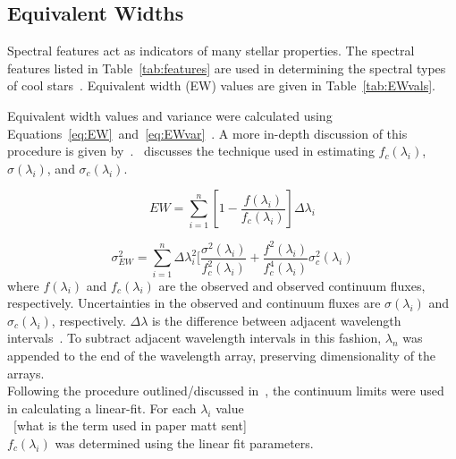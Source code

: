 \subsection{Equivalent Widths}

Spectral features act as indicators of many stellar properties.  The 
spectral features listed in Table~\ref{tab:features} 
are used in determining the spectral types of cool 
stars~\cite{Rayner_2009}.  Equivalent width (EW) 
values are given in Table~\ref{tab:EWvals}.  

 



Equivalent width values and variance were calculated using Equations~\ref{eq:EW}~and~\ref{eq:EWvar}~\cite{Cushing_2005}. %
A more in-depth discussion of this procedure is given by~\cite{Cushing_2005}.  \cite{Sembach_1992}~discusses the technique used in estimating $f_{c}(\lambda_{i})$, $\sigma(\lambda_{i})$, and $\sigma_{c}(\lambda_{i})$.



\begin{equation}\label{eq:EW}
	EW = \sum_{i=1}^{n} [1 - \frac{f(\lambda_{i})}{f_{c}(\lambda_{i})}] \Delta\lambda_{i}
\end{equation}

\begin{equation}\label{eq:EWvar}
	\sigma_{EW}^{2} = \sum_{i=1}^{n} \Delta\lambda_{i}^{2} [\frac{\sigma^{2}(\lambda_{i})}{f_{c}^{2}(\lambda_{i})} + \frac{f^{2}(\lambda_{i})}{f_{c}^{4}(\lambda_{i})}\sigma_{c}^{2}(\lambda_{i})
\end{equation}
where $f(\lambda_{i})$ and $f_{c}(\lambda_{i})$ are the observed 
and observed continuum fluxes, respectively.  Uncertainties in the 
observed and continuum fluxes are $\sigma(\lambda_{i})$ and 
$\sigma_{c}(\lambda_{i})$, respectively.  $\Delta\lambda$ is the 
difference between adjacent wavelength intervals~\cite{Sembach_1992}.
To subtract adjacent wavelength intervals in this fashion, $\lambda_{n}$ was appended to the end of the wavelength array, preserving dimensionality of the arrays.\\


Following the procedure outlined/discussed in~\cite{Cushing_2005}, the continuum limits were used in calculating a linear-fit.  For each $\lambda_{i}$ value\\
~[what is the term used in paper matt sent]\\
$f_{c}(\lambda_{i})$ was determined using the linear fit parameters.
 

